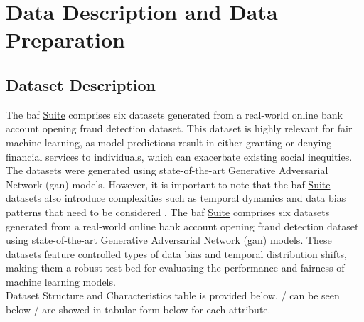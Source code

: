 \documentclass[12pt,a4paper]{report}
\begin{document}
\chapter{Data Description and Data Preparation}
\section{Dataset Description}
The \acrshort{baf} \href{https://www.kaggle.com/datasets/sgpjesus/bank-account-fraud-dataset-neurips-2022/code}{Suite} comprises six datasets generated from a real-world online bank account opening fraud detection dataset. This dataset is highly relevant for fair machine learning, as model predictions result in either granting or denying financial services to individuals, which can exacerbate existing social inequities. The datasets were generated using state-of-the-art Generative Adversarial Network (\acrshort{gan}) models. However, it is important to note that the \acrshort{baf} \href{https://www.kaggle.com/datasets/sgpjesus/bank-account-fraud-dataset-neurips-2022/code}{Suite} datasets also introduce complexities such as temporal dynamics and data bias patterns that need to be considered \citep{jesus2022turning}. The \acrshort{baf} \href{https://www.kaggle.com/datasets/sgpjesus/bank-account-fraud-dataset-neurips-2022/code}{Suite} comprises six datasets generated from a real-world online bank account opening fraud detection dataset using state-of-the-art Generative Adversarial Network (\acrshort{gan}) models. These datasets feature controlled types of data bias and temporal distribution shifts, making them a robust test bed for evaluating the performance and fairness of machine learning models.\\

Dataset Structure and Characteristics table is provided below. / can be seen below / are showed in tabular form below for each attribute.
\end{document}
